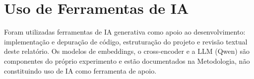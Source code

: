 \documentclass[9pt,a4paper,twocolumn]{article}
\begin{document}
\section{Uso de Ferramentas de IA}
Foram utilizadas ferramentas de IA generativa como apoio ao desenvolvimento: implementação e
depuração de código, estruturação do projeto e revisão textual deste relatório. Os modelos de
embeddings, o cross-encoder e a LLM (Qwen) são componentes do próprio experimento e estão
documentados na Metodologia, não constituindo uso de IA como ferramenta de apoio.
\end{document}
